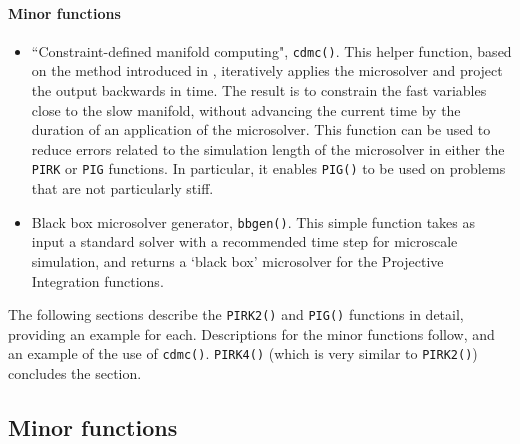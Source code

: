 \paragraph{Minor functions}
\begin{itemize}
\item ``Constraint-defined manifold computing", \verb|cdmc()|.
This helper function, based on the method introduced in \cite{GearKevrekidis05},  iteratively applies the microsolver and project the output backwards in time.
The result is to constrain the fast variables close to the slow manifold, without advancing the current time by the duration of an application of the microsolver.
This function can be used to reduce errors related to the simulation length of the microsolver in either the \verb|PIRK| or \verb|PIG| functions.
In particular, it enables \verb|PIG()| to be used on problems that are not particularly stiff.
\item Black box microsolver generator, \verb|bbgen()|.
This simple function takes as input a standard solver with a recommended time step for microscale simulation, and returns a `black box' microsolver for the Projective Integration functions.
\end{itemize}

The following sections describe the \verb|PIRK2()| and \verb|PIG()| functions in detail, providing an example for each.
Descriptions for the minor functions follow, and an example of the use of \verb|cdmc()|.
\verb|PIRK4()| (which is very similar to \verb|PIRK2()|) concludes the section.







\subsection{Minor functions}
\label{sec:extras}










